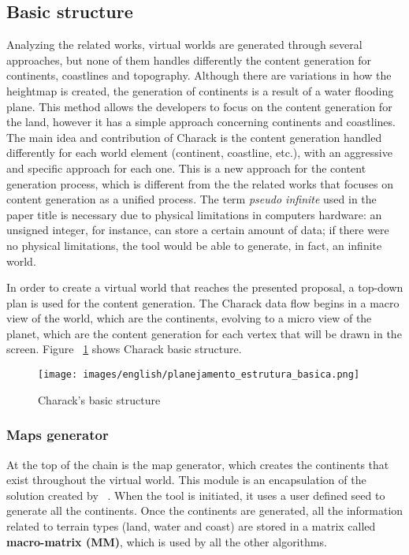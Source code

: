 \documentclass[10pt, conference, compsocconf]{IEEEtran}
\begin{document}
\subsection{Basic structure}
\label{sec:basic-structure}

Analyzing the related works, virtual worlds are generated through several approaches, but none of them handles differently the content generation for continents, coastlines and topography. Although there are variations in how the heightmap is created, the generation of continents is a result of a water flooding plane. This method allows the developers to focus on the content generation for the land, however it has a simple approach concerning continents and coastlines. The main idea and contribution of Charack is the content generation handled differently for each world element (continent, coastline, etc.), with an aggressive and specific approach for each one. This is a new approach for the content generation process, which is different from the the related works that focuses on content generation as a unified process. The term {\it pseudo infinite} used in the paper title is necessary due to physical limitations in computers hardware: an unsigned integer, for instance, can store a certain amount of data; if there were no physical limitations, the tool would be able to generate, in fact, an infinite world.

In order to create a virtual world that reaches the presented proposal, a top-down plan is used for the content generation. The Charack data flow begins in a macro view of the world, which are the continents, evolving to a micro view of the planet, which are the content generation for each vertex that will be drawn in the screen. Figure ~\ref{fig:planejamento_estrutura_basica} shows Charack basic structure.

\begin{figure}[!t]
\centering
\texttt{[image: images/english/planejamento\_estrutura\_basica.png]}
\caption{Charack's basic structure}
\label{fig:planejamento_estrutura_basica}
\end{figure}

\subsubsection{Maps generator}

At the top of the chain is the map generator, which creates the continents that exist throughout the virtual world. This module is an encapsulation of the solution created by ~\cite{torben}. When the tool is initiated, it uses a user defined seed to generate all the continents. Once the continents are generated, all the information related to terrain types (land, water and coast) are stored in a matrix called {\bf macro-matrix (MM)}, which is used by all the other algorithms.
\end{document}
